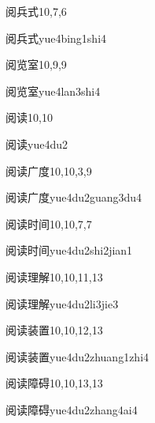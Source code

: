 \begin{entry}{阅兵式}{10,7,6}
  \begin{phonetics}{阅兵式}{yue4bing1shi4}
  \end{phonetics}
\end{entry}

\begin{entry}{阅览室}{10,9,9}
  \begin{phonetics}{阅览室}{yue4lan3shi4}
  \end{phonetics}
\end{entry}

\begin{entry}{阅读}{10,10}
  \begin{phonetics}{阅读}{yue4du2}
  \end{phonetics}
\end{entry}

\begin{entry}{阅读广度}{10,10,3,9}
  \begin{phonetics}{阅读广度}{yue4du2guang3du4}
  \end{phonetics}
\end{entry}

\begin{entry}{阅读时间}{10,10,7,7}
  \begin{phonetics}{阅读时间}{yue4du2shi2jian1}
  \end{phonetics}
\end{entry}

\begin{entry}{阅读理解}{10,10,11,13}
  \begin{phonetics}{阅读理解}{yue4du2li3jie3}
  \end{phonetics}
\end{entry}

\begin{entry}{阅读装置}{10,10,12,13}
  \begin{phonetics}{阅读装置}{yue4du2zhuang1zhi4}
  \end{phonetics}
\end{entry}

\begin{entry}{阅读障碍}{10,10,13,13}
  \begin{phonetics}{阅读障碍}{yue4du2zhang4ai4}
  \end{phonetics}
\end{entry}

